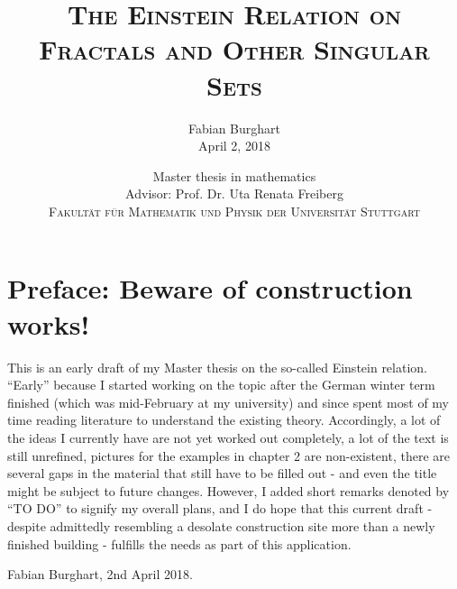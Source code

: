 \documentclass[a4paper,11pt,twoside,notitlepage]{report}
\title{$\ $\\ \textsc{The Einstein Relation on Fractals and Other Singular Sets}\\$\ $}
\author{{\Large {Fabian Burghart}}\\[1em]
  {\large April 2, 2018}\\[10em]}
\date{{\large Master thesis in mathematics}\\
  {\large Advisor: Prof. Dr. Uta Renata Freiberg}\\[7em]
  {\large \textsc{Fakult{\"a}t f{\"u}r Mathematik und Physik der Universit{\"a}t Stuttgart}}}
\begin{document}
\maketitle
\thispagestyle{empty}
\newpage

\thispagestyle{empty}

\section*{Preface: Beware of construction works!}

This is an early draft of my Master thesis on the so-called Einstein relation. ``Early'' because I started working on the topic after the German winter term finished (which was mid-February at my university) and since spent most of my time reading literature to understand the existing theory. Accordingly, a lot of the ideas I currently have are not yet worked out completely, a lot of the text is still unrefined, pictures for the examples in chapter 2 are non-existent, there are several gaps in the material that still have to be filled out - and even the title might be subject to future changes. However, I added short remarks denoted by ``TO DO'' to signify my overall plans, and I do hope that this current draft - despite admittedly resembling a desolate construction site more than a newly finished building - fulfills the needs as part of this application.

\begin{flushright}
  Fabian Burghart, 2nd April 2018. 
\end{flushright}


\tableofcontents









\nocite{*}   %

\printbibliography
{}
\end{document}
